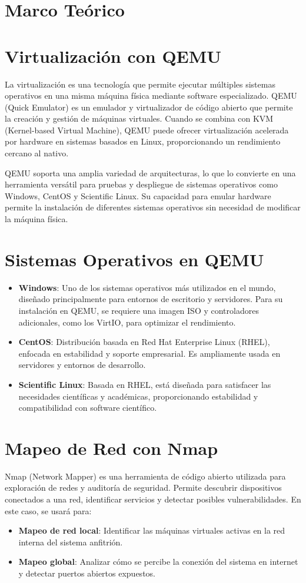 \documentclass[conference]{IEEEtran}
\begin{document}
\section{Marco Teórico}
\section{Virtualización con QEMU}
La virtualización es una tecnología que permite ejecutar múltiples sistemas operativos en una misma máquina física mediante software especializado. QEMU (Quick Emulator) es un emulador y virtualizador de código abierto que permite la creación y gestión de máquinas virtuales. Cuando se combina con KVM (Kernel-based Virtual Machine), QEMU puede ofrecer virtualización acelerada por hardware en sistemas basados en Linux, proporcionando un rendimiento cercano al nativo.

QEMU soporta una amplia variedad de arquitecturas, lo que lo convierte en una herramienta versátil para pruebas y despliegue de sistemas operativos como Windows, CentOS y Scientific Linux. Su capacidad para emular hardware permite la instalación de diferentes sistemas operativos sin necesidad de modificar la máquina física.

\section{Sistemas Operativos en QEMU}
\begin{itemize}
\item \textbf{Windows}: Uno de los sistemas operativos más utilizados en el mundo, diseñado principalmente para entornos de escritorio y servidores. Para su instalación en QEMU, se requiere una imagen ISO y controladores adicionales, como los VirtIO, para optimizar el rendimiento.
\item \textbf{CentOS}: Distribución basada en Red Hat Enterprise Linux (RHEL), enfocada en estabilidad y soporte empresarial. Es ampliamente usada en servidores y entornos de desarrollo.
\item \textbf{Scientific Linux}: Basada en RHEL, está diseñada para satisfacer las necesidades científicas y académicas, proporcionando estabilidad y compatibilidad con software científico.
\end{itemize}

\section{Mapeo de Red con Nmap}
Nmap (Network Mapper) es una herramienta de código abierto utilizada para exploración de redes y auditoría de seguridad. Permite descubrir dispositivos conectados a una red, identificar servicios y detectar posibles vulnerabilidades. En este caso, se usará para:
\begin{itemize}
\item \textbf{Mapeo de red local}: Identificar las máquinas virtuales activas en la red interna del sistema anfitrión.
\item \textbf{Mapeo global}: Analizar cómo se percibe la conexión del sistema en internet y detectar puertos abiertos expuestos.
\end{itemize}
\end{document}
